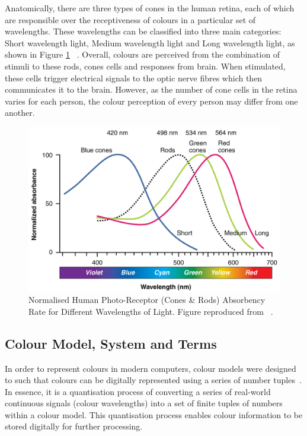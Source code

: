 Anatomically, there are three types of cones in the human retina, each of which
are responsible over the receptiveness of colours in a particular set of
wavelengths. These wavelengths can be classified into three main categories:
Short wavelength light, Medium wavelength light and Long wavelength light, as shown in Figure \ref{fig:visibleSpectrum} ~\cite{eyespectrum}. Overall, colours are perceived from the combination of stimuli to these rods, cones cells and responses from
brain. When stimulated, these cells trigger electrical signals to the optic nerve
fibres which then communicates it to the brain. However, as the number of cone cells
in the retina varies for each person, the colour perception of every person may differ from one another.


\begin{figure}[hbt!]
 \centering
 \includegraphics[width=.7\textwidth]{image/lit/ColorSensitivity.jpg}
 \caption[Normalised Human Photo-Receptor Absorbency Rate for Different
 Wavelength Lights]{Normalised Human Photo-Receptor (Cones \& Rods) Absorbency
 Rate for Different Wavelengths of Light. Figure reproduced from {~.}%
 }
\label{fig:visibleSpectrum}
\end{figure}


\vspace{1em}
\subsection{Colour Model, System and Terms}
\label{section:colourterm}

In order to represent colours in modern computers, colour models were designed
to such that colours can be digitally represented using a series of number
tuples~\cite{travis1991effective}. In essence, it is a quantisation process of converting
a series of real-world continuous signals (colour wavelengths) into a set of
finite tuples of numbers within a colour model. This quantisation process enables 
colour information to be stored digitally for further processing.


